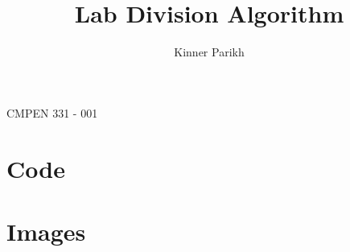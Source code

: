 \documentclass[11pt]{article}
\begin{document}
%
\author{Kinner Parikh}
\title{Lab Division Algorithm}
\maketitle
\begin{center}
    CMPEN 331 - 001
\end{center}

\newpage

\section{Code}


\ttfamily


\newpage

\ttfamily


\newpage

\ttfamily


\newpage

\ttfamily


\rmfamily
\section{Images}
\end{document}
